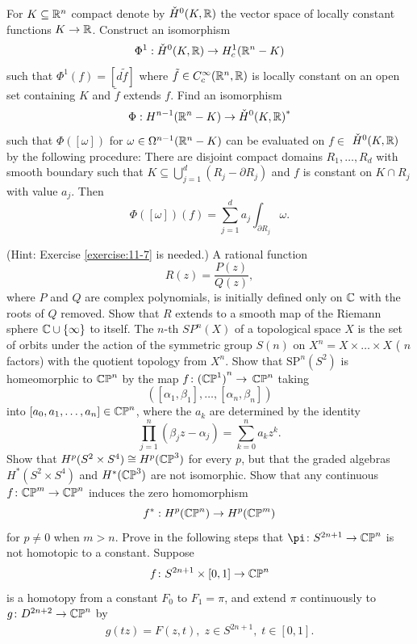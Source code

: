 \begin{enumerate}[\theexercise.1]
\[    \]
  \NewItem For $K \subseteq  {\ensuremath{\mathbb{R}}}^{n}$ compact denote by ${\check{H}}^{0}( {K,\mathbb{R}})$ the vector space of locally constant functions $K \rightarrow  \mathbb{R}$. Construct an isomorphism
    \[
      {\Phi }^{1} : {\check{H}}^{0}( {K,\mathbb{R}})  \rightarrow  {H}_{c}^{1}( {{\mathbb{R}}^{n}- K})
    \]
    such that ${\Phi }^{1}( f)  = [  {d\tilde{f}}]$ where $\tilde{f} \in  {C}_{c}^{\infty }( {{\mathbb{R}}^{n},\mathbb{R}})$ is locally constant on an open set containing $K$ and $\tilde{f}$ extends $f$. Find an isomorphism
    \[
      \Phi  : {H}^{n- 1}( {{\mathbb{R}}^{n}- K})  \rightarrow  {\check{H}}^{0}{( K,\mathbb{R}) }^*
    \]
    such that $\Phi ( [  \omega ]  )$ for $\omega  \in  {\Omega }^{n- 1}( {{\mathbb{R}}^{n}- K})$ can be evaluated on $f \in$  ${\check{H}}^{0}( {K,\mathbb{R}})$ by the following procedure:
    There are disjoint compact domains ${R}_{1},\ldots,{R}_{d}$ with smooth boundary such that $K \subseteq \bigcup_{{j = 1}}^{d}( {{R}_{j}- \partial {R}_{j}})$ and $f$ is constant on $K \cap  {R}_{j}$ with value ${a}_{j}$. Then
    \[
      \Phi ( [  \omega ]  ) ( f)  = \sum_{{j = 1}}^{d}{a}_{j}\int_{\partial {R}_{j}}\omega.
    \]
    \par(Hint: Exercise \ref{exercise:11-7} is needed.)
  \newchap[14]
  \NewItem A rational function
    \[
      R( z)  = \frac{P( z) }{Q( z) },
    \]
    where $P$ and $Q$ are complex polynomials, is initially defined only on $\mathbb{C}$ with the roots of $Q$ removed. Show that $R$ extends to a smooth map of the Riemann sphere $\mathbb{C} \cup  \{ \infty \}$ to itself.
  \NewItem The $n$-th  $S\!P^{n}(X)$ of a topological space $X$ is the set of orbits under the action of the symmetric group $S( n)$ on ${X}^{n} = X \times  \ldots  \times  X$ ( $n$ factors) with the quotient topology from ${X}^{n}$.
    Show that ${\mathrm{{SP}}}^{n}( {S}^{2})$ is homeomorphic to ${\mathbb{{CP}}}^{n}$ by the map $f\colon {( {\ensuremath{\mathbb{{CP}}}}^{1}) }^{n} \rightarrow$  ${\mathbb{{CP}}}^{n}$ taking
    \[
      ( {[  {{\alpha }_{1},{\beta }_{1}}] ,\ldots,[  {{\alpha }_{n},{\beta }_{n}}]  })
    \]
    into $[  {{a}_{0},{a}_{1},\ldots,{a}_{n}}]   \in  {\ensuremath{\mathbb{{CP}}}}^{n}$, where the ${a}_{k}$ are determined by the identity
    \[
      \prod_{j = 1}^{n}( {\beta_{j}z- {\alpha }_{j}})  = \sum_{{k = 0}}^{n}{a}_{k}{z}^{k}.
    \]
  \NewItem Show that ${H}^{p}( {{S}^{2} \times  {S}^{4}})  \cong  {H}^{p}( {\mathbb{{CP}}}^{3})$ for every $p$, but that the graded algebras ${H}^*( {{S}^{2} \times  {S}^{4}})$ and ${H}^*( {\mathbb{{CP}}}^{3})$ are not isomorphic.
  \NewItem Show that any continuous $f\colon {\ensuremath{\mathbb{{CP}}}}^{m} \rightarrow  {\ensuremath{\mathbb{{CP}}}}^{n}$ induces the zero homomorphism
    \[
      {f}^* : {H}^{p}( {\mathbb{{CP}}}^{n})  \rightarrow  {H}^{p}( {\mathbb{{CP}}}^{m})
    \]
    for $p \neq  0$ when $m > n$.
  \NewItem Prove in the following steps that $\pi\colon  {S}^{{2n} + 1} \ra  {\B{{CP}}}^{n}$ is not homotopic to a constant. Suppose
    \[
      f\colon {S}^{{2n} + 1} \times  [  {0,1}]   \rightarrow  {\ensuremath{\mathbb{{CP}}}}^{n}
    \]
    is a homotopy from a constant ${F}_{0}$ to ${F}_{1} = \pi$, and extend $\pi$ continuously to $g\colon {D}^{{2n} + 2} \rightarrow  {\ensuremath{\mathbb{{CP}}}}^{n}$ by
    \begin{align*}%
      g( {tz})  = F( {z,t}),\;z \in  {S}^{{2n} + 1},\;t \in  [  {0,1}] .
    \end{align*}
    

\end{enumerate}
